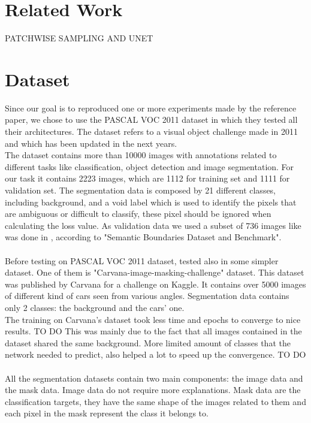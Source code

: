 \documentclass[10pt,twocolumn,letterpaper]{article}
\begin{document}
\section{Related Work}

PATCHWISE SAMPLING AND UNET

\section{Dataset}

Since our goal is to reproduced one or more experiments made by the reference paper\cite{projectPaper}, we chose to use the PASCAL VOC 2011\cite{pascal-voc-2011} dataset in which they tested all their architectures.
The dataset refers to a visual object challenge made in 2011 and which has been updated in the next years. \\
The dataset contains more than 10000 images with annotations related to different tasks like classification, object detection and image segmentation.
For our task it contains 2223 images, which are 1112 for training set and 1111 for validation set.
The segmentation data is composed by 21 different classes, including background, and a void label which is used to identify the pixels that are ambiguous or difficult to classify, these pixel should be ignored when calculating the loss value.
As validation data we used a subset of 736 images like was done in \cite{projectPaper}, according to "Semantic Boundaries Dataset and Benchmark"\cite{BharathICCV2011}. \\ \\
Before testing on PASCAL VOC 2011 dataset, tested also in some simpler dataset.
One of them is "Carvana-image-masking-challenge"\cite{carvana} dataset. This dataset was published by Carvana for a challenge on Kaggle. It contains over 5000 images of different kind of cars seen from various angles. Segmentation data contains only 2 classes: the background and the cars' one. \\
The training on Carvana's dataset took less time and epochs to converge to nice results. TO DO
This was mainly due to the fact that all images contained in the dataset shared the same background. More limited amount of classes that the network needed to predict, also helped a lot to speed up the convergence. TO DO \\ \\
All the segmentation datasets contain two main components: the image data and the mask data. Image data do not require more explanations. Mask data are the classification targets, they have the same shape of the images related to them and each pixel in the mask represent the class it belongs to.
\end{document}
